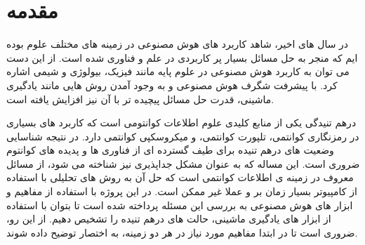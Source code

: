 \section{مقدمه}


در سال های اخیر، شاهد کاربرد های هوش مصنوعی در زمینه های مختلف علوم بوده ایم که منجر به حل مسائل بسیار پر کاربردی در علم و فناوری شده است. از این دست می توان به کاربرد هوش مصنوعی در علوم پایه مانند فیزیک، بیولوژی و شیمی اشاره کرد. با پیشرفت شگرف هوش مصنوعی و به وجود آمدن روش هایی مانند یادگیری ماشینی، قدرت حل مسائل پیچیده تر با آن نیز افزایش یافته است.

درهم تنیدگی یکی از منابع کلیدی علوم اطلاعات کوانتومی است که کاربرد های بسیاری در رمزنگاری کوانتمی، تلپورت کوانتمی، و میکروسکپی کوانتمی دارد. در نتیجه شناسایی وضعیت های درهم تنیده برای طیف گسترده ای از فناوری ها و پدیده های کوانتوم ضروری است. این مساله که به عنوان مشکل جداپذیری نیز شناخته می شود، از مسائل معروف در زمینه ی اطلاعات کوانتمی است که حل آن به روش های تحلیلی با استفاده از کامپیوتر بسیار زمان بر و عملا غیر ممکن است.
 در این پروژه با استفاده از مفاهیم و ابزار های هوش مصنوعی به بررسی این مسئله پرداخته شده است تا بتوان با استفاده از ابزار های یادگیری ماشینی، حالت های درهم تنیده را تشخیص دهیم.
 از این رو، ضروری است تا در ابتدا مفاهیم مورد نیاز در هر دو زمینه، به اختصار توضیح داده شوند.
